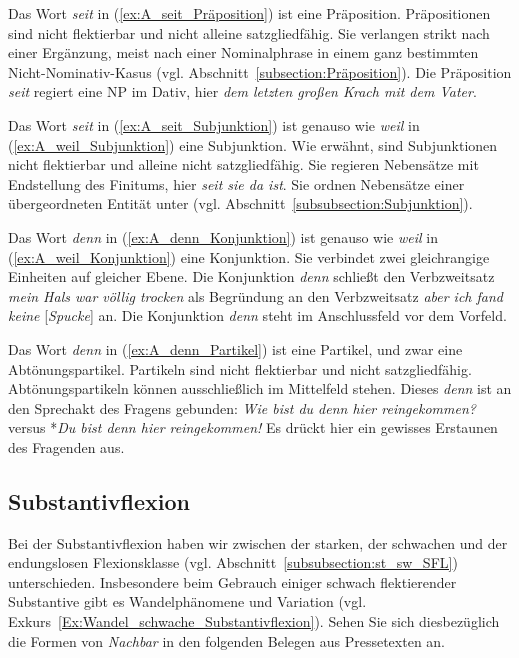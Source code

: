 Das Wort \textit{seit} in (\ref{ex:A_seit_Präposition}) ist eine Präposition. Präpositionen sind nicht flektierbar und nicht alleine satzgliedfähig. Sie verlangen strikt nach einer Ergänzung, meist nach einer Nominalphrase in einem ganz bestimmten Nicht-Nominativ-Kasus (vgl. Abschnitt~\ref{subsection:Präposition}). Die Präposition \textit{seit} regiert eine NP im Dativ, hier \textit{dem letzten großen Krach mit dem Vater}.

Das Wort \textit{seit} in (\ref{ex:A_seit_Subjunktion}) ist genauso wie \textit{weil} in (\ref{ex:A_weil_Subjunktion}) eine Subjunktion. Wie erwähnt, sind Subjunktionen nicht flektierbar und alleine nicht satzgliedfähig. Sie regieren Nebensätze mit Endstellung des Finitums, hier \textit{seit sie da ist}. Sie ordnen Nebensätze einer übergeordneten Entität unter (vgl. Abschnitt~\ref{subsubsection:Subjunktion}). 

Das Wort \textit{denn} in (\ref{ex:A_denn_Konjunktion}) ist genauso wie \textit{weil} in (\ref{ex:A_weil_Konjunktion}) eine Konjunktion. Sie verbindet zwei gleichrangige Einheiten auf gleicher Ebene. Die Konjunktion \textit{denn} schließt den Verbzweitsatz \textit{mein Hals war völlig trocken} als Begründung an den Verbzweitsatz \textit{aber ich fand keine} [\textit{Spucke}] an. Die Konjunktion \textit{denn} steht im Anschlussfeld vor dem Vorfeld. 

Das Wort \textit{denn} in (\ref{ex:A_denn_Partikel}) ist eine Partikel, und zwar eine Abtönungspartikel. Partikeln sind nicht flektierbar und nicht satzgliedfähig. Abtönungspartikeln können ausschließlich im Mittelfeld stehen. Dieses \textit{denn} ist an den Sprechakt des Fragens gebunden: \textit{Wie bist du denn hier reingekommen?} versus *\textit{Du bist denn hier reingekommen!} Es drückt hier ein gewisses Erstaunen des Fragenden aus.


\subsection{Substantivflexion}\label{subsection:A_Substantivflexion}

Bei der Substantivflexion haben wir zwischen der starken, der schwachen und der endungslosen Flexionsklasse (vgl. Abschnitt~\ref{subsubsection:st_sw_SFL}) unterschieden. Insbesondere beim Gebrauch einiger schwach flektierender Substantive gibt es Wandelphänomene und Variation (vgl. Exkurs~\ref{Ex:Wandel_schwache_Substantivflexion}). Sehen Sie sich diesbezüglich die Formen von \textit{Nachbar} in den folgenden Belegen aus Pressetexten an.

